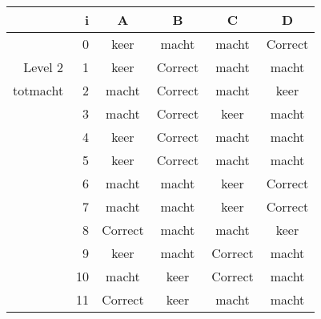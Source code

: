 \begin{tabular}{ rr| c|c|c|c}\hline\hline
     & i & \textbf{A} & \textbf{B} & \textbf{C} & \textbf{D}\\\hline

&0&keer&macht&macht&Correct\cellcolor[gray]{0.6}\\
Level 2 & 1&keer&Correct\cellcolor[gray]{0.6}&macht&macht\\
totmacht &2&macht&Correct\cellcolor[gray]{0.6}&macht&keer\\
&3&macht&Correct\cellcolor[gray]{0.6}&keer&macht\\
&4&keer&Correct\cellcolor[gray]{0.6}&macht&macht\\
&5&keer&Correct\cellcolor[gray]{0.6}&macht&macht\\
&6&macht&macht&keer&Correct\cellcolor[gray]{0.6}\\
&7&macht&macht&keer&Correct\cellcolor[gray]{0.6}\\
&8&Correct\cellcolor[gray]{0.6}&macht&macht&keer\\
&9&keer&macht&Correct\cellcolor[gray]{0.6}&macht\\
&10&macht&keer&Correct\cellcolor[gray]{0.6}&macht\\
&11&Correct\cellcolor[gray]{0.6}&keer&macht&macht\\
\hline\end{tabular}\par\ \newline

